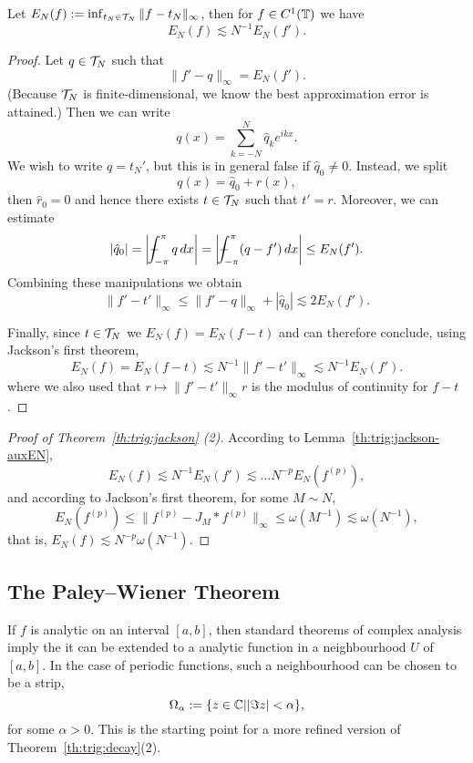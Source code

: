 \begin{lemma} \label{th:trig:jackson-auxEN}
  Let $E_N(f) := \inf_{t_N \in \mathcal{T}_N} \|f - t_N \|_\infty$, then for
  $f \in C^1(\mathbb{T})$ we have
  \[
    E_N(f) \lesssim N^{-1} E_N(f').
  \]
\end{lemma}
\begin{proof}
  Let $q \in \mathcal{T}_N$ such that
  \[
    \|f' - q\|_\infty = E_N(f').
  \]
  (Because $\mathcal{T}_N$ is finite-dimensional, we know the best approximation
  error is attained.) Then we can write
  \[
    q(x) = \sum_{k = -N}^N \hat{q}_{k} e^{ikx}.
  \]
  We wish to write $q =  t_N'$, but this is in general false if $\hat{q}_0 \neq 0$. Instead, we split
  \[
    q(x) = \hat{q}_0 + r(x),
  \]
  then $\hat{r}_0 = 0$ and hence there exists $t \in \mathcal{T}_N$ such  that $t' =  r$. Moreover, we can estimate
  \[
    |\hat{q}_0| = \bg| \mint_{-\pi}^\pi q \,dx \bg|
      = \bg| \mint_{-\pi}^\pi (q-f') \,dx \bg|
      \leq E_N(f').
  \]
  Combining these manipulations we obtain
  \[
    \| f' - t'\|_\infty
    \leq
    \| f' - q \|_\infty + |\hat{q}_0|
    \lesssim 2 E_N(f').
  \]

  Finally, since $t \in \mathcal{T}_N$ we $E_N(f) = E_N(f - t)$ and can therefore conclude, using Jackson's first theorem,
  \[
    E_N(f) = E_N(f - t)
    \lesssim N^{-1} \|f' - t'\|_\infty
    \lesssim N^{-1} E_N(f').
  \]
  where we also used that $r \mapsto \|f'-t'\|_\infty r$ is the modulus of continuity for $f - t$.
\end{proof}


\begin{proof}[Proof of Theorem~\ref{th:trig:jackson} (2)]
  According to Lemma~\ref{th:trig:jackson-auxEN},
  \[
    E_N(f) \lesssim N^{-1} E_N(f') \lesssim \dots
    N^{-p} E_N(f^{(p)}),
  \]
  and according to Jackson's first theorem, for some $M \sim N$,
  \[
    E_N(f^{(p)}) \leq \| f^{(p)} - J_M \ast f^{(p)} \|_\infty
      \leq \omega(M^{-1}) \lesssim \omega(N^{-1}),
  \]
  that is, $E_N(f) \lesssim N^{-p} \omega(N^{-1})$.
\end{proof}





\subsection{The Paley--Wiener Theorem}
%
\label{sec:trip:pw}
%
If $f$ is analytic on an interval $[a, b]$, then standard theorems of complex
analysis imply the it can be extended to a analytic function in a
neighbourhood $U$ of $[a, b]$. In the case of periodic functions, such a
neighbourhood can be chosen to be a strip,
\[
  \Omega_\alpha := \{ z \in \mathbb{C} | |\Im z| < \alpha \},
\]
for some $\alpha > 0$. This is the starting point for a more refined
version of Theorem~\ref{th:trig:decay}(2).

